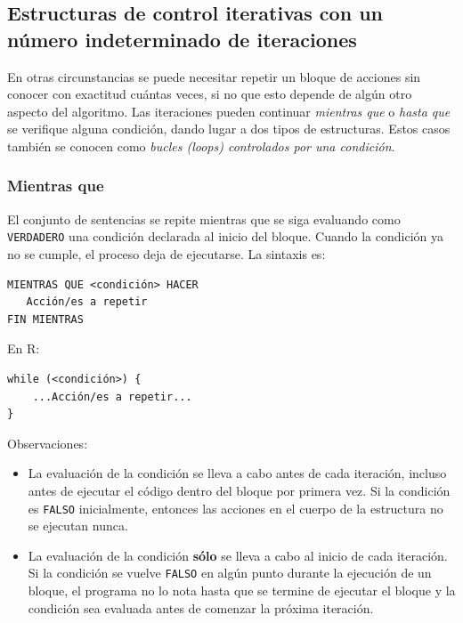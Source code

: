 \documentclass[
]{book}
\providecommand{\tightlist}{%
  \setlength{\itemsep}{0pt}\setlength{\parskip}{0pt}}
\begin{document}
\hypertarget{estructuras-de-control-iterativas-con-un-nuxfamero-indeterminado-de-iteraciones}{%
\subsection{Estructuras de control iterativas con un número indeterminado de iteraciones}\label{estructuras-de-control-iterativas-con-un-nuxfamero-indeterminado-de-iteraciones}}

En otras circunstancias se puede necesitar repetir un bloque de acciones sin conocer con exactitud cuántas veces, si no que esto depende de algún otro aspecto del algoritmo. Las iteraciones pueden continuar \emph{mientras que} o \emph{hasta que} se verifique alguna condición, dando lugar a dos tipos de estructuras. Estos casos también se conocen como \emph{bucles (loops) controlados por una condición}.

\hypertarget{mientras-que}{%
\subsubsection{Mientras que}\label{mientras-que}}

El conjunto de sentencias se repite mientras que se siga evaluando como \texttt{VERDADERO} una condición declarada al inicio del bloque. Cuando la condición ya no se cumple, el proceso deja de ejecutarse. La sintaxis es:

\begin{verbatim}
MIENTRAS QUE <condición> HACER
   Acción/es a repetir
FIN MIENTRAS
\end{verbatim}

En R:

\begin{verbatim}
while (<condición>) {
    ...Acción/es a repetir...
}
\end{verbatim}

Observaciones:

\begin{itemize}
\tightlist
\item
  La evaluación de la condición se lleva a cabo antes de cada iteración, incluso antes de ejecutar el código dentro del bloque por primera vez. Si la condición es \texttt{FALSO} inicialmente, entonces las acciones en el cuerpo de la estructura no se ejecutan nunca.
\item
  La evaluación de la condición \textbf{sólo} se lleva a cabo al inicio de cada iteración. Si la condición se vuelve \texttt{FALSO} en algún punto durante la ejecución de un bloque, el programa no lo nota hasta que se termine de ejecutar el bloque y la condición sea evaluada antes de comenzar la próxima iteración.
\end{itemize}
\end{document}

